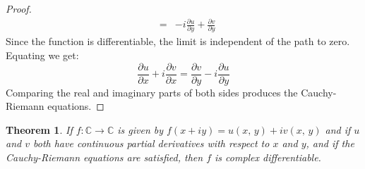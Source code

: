 \documentclass{article}
\newtheorem{theorem}{Theorem}[section]
\theoremstyle{definition}
\begin{document}
\begin{proof}
\begin{equation}
\begin{array}{rcl}
                    &=&
                    \displaystyle
                    -i\frac{\partial{u}}{\partial{y}}
                        +\frac{\partial{v}}{\partial{y}}
                \end{array}
            \end{equation}
            Since the function is differentiable, the limit is independent of
            the path to zero. Equating we get:
            \begin{equation}
                \frac{\partial{u}}{\partial{x}}
                +i\frac{\partial{v}}{\partial{x}}
                =
                \frac{\partial{v}}{\partial{y}}
                -i\frac{\partial{u}}{\partial{y}}
            \end{equation}
            Comparing the real and imaginary parts of both sides
            produces the Cauchy-Riemann equations.
        \end{proof}
        \begin{theorem}
            If $f:\mathbb{C}\rightarrow\mathbb{C}$ is given by
            $f(x+iy)=u(x,\,y)+iv(x,\,y)$ and if $u$ and $v$ both have
            continuous partial derivatives with respect to $x$ and $y$,
            and if the Cauchy-Riemann equations are satisfied, then $f$ is
            complex differentiable.
        \end{theorem}
\end{document}
